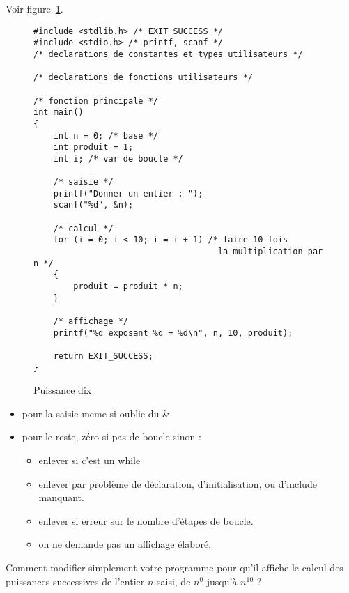 \begin{correction}
Voir figure~\ref{fig:puissance}.
  \begin{figure}[htbp]
    \begin{small}
      \begin{verbatim}
#include <stdlib.h> /* EXIT_SUCCESS */
#include <stdio.h> /* printf, scanf */
/* declarations de constantes et types utilisateurs */

/* declarations de fonctions utilisateurs */

/* fonction principale */
int main()
{
    int n = 0; /* base */
    int produit = 1;
    int i; /* var de boucle */

    /* saisie */
    printf("Donner un entier : ");
    scanf("%d", &n);

    /* calcul */
    for (i = 0; i < 10; i = i + 1) /* faire 10 fois 
                                     la multiplication par n */
    {
        produit = produit * n;
    }

    /* affichage */
    printf("%d exposant %d = %d\n", n, 10, produit);

    return EXIT_SUCCESS;
}
\end{verbatim}
    \end{small}
    \caption{Puissance dix}
    \label{fig:puissance}
  \end{figure}
  \begin{baremeenv}
    \begin{itemize}
    \item {} pour la saisie meme si oublie du \&
    \item {} pour le reste, zéro si pas de boucle sinon :
      \begin{itemize}
      \item enlever  si c'est un while
      \item enlever  par problème de déclaration, d'initialisation,
        ou d'include manquant. 
\item enlever  si erreur sur le nombre d'étapes de boucle.
      \item on ne demande pas un affichage élaboré.
      \end{itemize}
    \end{itemize}
  \end{baremeenv}
\end{correction}

\question Comment modifier simplement votre programme pour qu'il
affiche le calcul des puissances successives de l'entier $n$ saisi,
de $n^0$ jusqu'à $n^{10}$ ?


